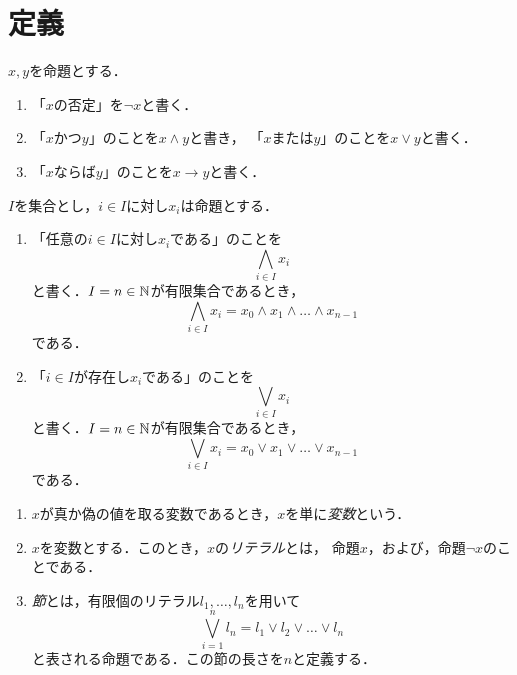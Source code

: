 
\section{定義}

\begin{nota}
 $x, y$を命題とする．
 \begin{enumerate}[1.]
  \item 「$x$の否定」を$\lnot x$と書く．
  \item 「$x$かつ$y$」のことを$x \land y$と書き，
        「$x$または$y$」のことを$x \lor y$と書く．
  \item 「$x$ならば$y$」のことを$x \rightarrow y$と書く．
 \end{enumerate}
\end{nota}

\begin{nota}
 $I$を集合とし，$i \in I$に対し$x_i$は命題とする．
 \begin{enumerate}[1.]
  \item 「任意の$i \in I$に対し$x_i$である」のことを
        \[
         \bigwedge_{i \in I} x_i
        \]
        と書く．$I = n \in \mathbb{N}$が有限集合であるとき，
        \[
         \bigwedge_{i \in I} x_i = x_0 \land x_1 \land \dots \land x_{n-1}
        \]
        である．
  \item 「$i \in I$が存在し$x_i$である」のことを
        \[
         \bigvee_{i \in I} x_i
        \]
        と書く．$I = n \in \mathbb{N}$が有限集合であるとき，
        \[
         \bigvee_{i \in I} x_i = x_0 \lor x_1 \lor \dots \lor x_{n-1}
        \]
        である．
 \end{enumerate}
\end{nota}

\begin{defn}
 \begin{enumerate}[1.]
  \item $x$が真か偽の値を取る変数であるとき，$x$を単に\emph{変数}という．
  \item $x$を変数とする．このとき，$x$の\emph{リテラル}とは，
        命題$x$，および，命題$\lnot x$のことである．
  \item \emph{節}とは，有限個のリテラル$l_1, \dots, l_n$を用いて
        \[
         \bigvee_{i = 1}^n l_n = l_1 \lor l_2 \lor \dots \lor l_n
        \]
        と表される命題である．この節の長さを$n$と定義する．
 \end{enumerate}
\end{defn}


